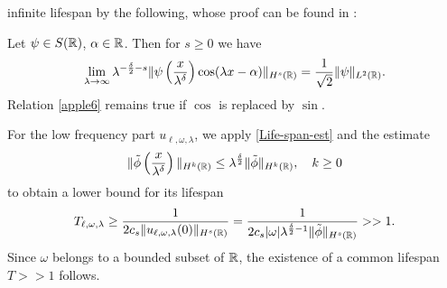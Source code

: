 infinite lifespan by the following, whose 
proof can be found in \cite{Himonas:2009fk}: 
%
%
\begin{lemma}
\label{applea}
Let $\psi \in S(\mathbb{R})$, $\alpha \in \mathbb{R}$. Then for $s \ge 0$ we have
%
%
\begin{equation}
\begin{split}
\lim_{\lambda \to \infty} \lambda^{-\frac{\delta}{2}-s}
\|\psi \left( \frac{x}{\lambda^\delta} \right)\cos(\lambda
x - \alpha) \|_{H^s(\mathbb{R})} = \frac{1}{\sqrt
2}\|\psi\|_{L^2(\mathbb{R})}.
\label{apple6}
\end{split}
\end{equation}
%
%
Relation \eqref{apple6} remains true if $\cos$ is
replaced by $\sin$.
\end{lemma}
%
%
For the low frequency part $u_{\ell, \omega, \lambda}$, we apply \eqref{Life-span-est} and the estimate
%
%
\begin{equation}
\begin{split}
\label{tildphi}
\|\tilde{\phi}\left( \frac{x}{\lambda^\delta}
\right)\|_{H^{k}(\mathbb{R})} \le
\lambda^{\frac{\delta}{2}}\|\tilde{\phi}\|_{H^{k}(\mathbb{R})},
\quad k\ge 0
\end{split}
\end{equation}
%
%
to obtain a lower bound for its lifespan
%
\begin{equation*}
\label{lifespan-bound-1}
\begin{split}
T_{\ell, \omega,\lambda} \ge \frac{1}{2 c_s \|u_{\ell, \omega, \lambda}(0)\|_{H^s(\mathbb{R})}} = 
\frac{1}{2 c_s |\omega|
\lambda^{\frac{\delta}{2}-1}\|\tilde{\phi}\|_{H^s(\mathbb{R})}} >> 1.
\end{split}
\end{equation*}
%
%
Since $\omega$ belongs to a bounded subset of $\mathbb{R}$, the existence of a 
common lifespan $T >> 1$ follows. 
%
%

